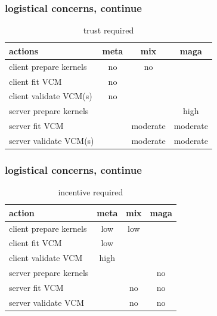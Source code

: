 \documentclass{beamer}
\begin{document}
\begin{frame}\frametitle{logistical concerns, continue}
  \begin{table}[h]
    \label{tb:trust}
    \begin{tabular}{|l|c|c|c|}
      \hline
      \textbf{actions}        & \textbf{meta} & \textbf{mix}  & \textbf{maga} \\ \hline
      client prepare kernels  & no            & no            &               \\ \hline
      client fit VCM          & no            &               &               \\ \hline
      client validate VCM(s)  & no            &               &               \\ \hline
      server prepare kernels  &               &               & high          \\ \hline
      server fit VCM          &               & moderate      & moderate      \\ \hline
      server validate VCM(s)  &               & moderate      & moderate      \\ \hline
    \end{tabular}
    \caption{trust required}
  \end{table}
\end{frame}
\begin{frame}\frametitle{logistical concerns, continue}
  \begin{table}[]
    \begin{tabular}{|l|c|c|c|}
      \hline
      \textbf{action}        & \textbf{meta} & \textbf{mix} & \textbf{maga} \\ \hline
      client prepare kernels & low           & low          &               \\ \hline
      client fit VCM         & low           &              &               \\ \hline
      client validate VCM    & high          &              &               \\ \hline
      server prepare kernels &               &              & no            \\ \hline
      server fit VCM         &               & no           & no            \\ \hline
      server validate VCM    &               & no           & no            \\ \hline
    \end{tabular}
    \caption{incentive required}
  \end{table}
\end{frame}
\end{document}
